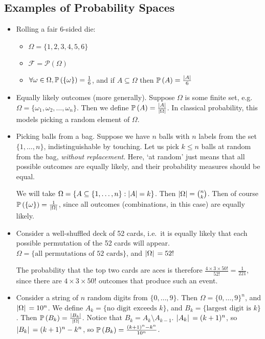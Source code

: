 \subsection{Examples of Probability Spaces}
\begin{itemize}
	\item Rolling a fair 6-sided die:
	      \begin{itemize}
		      \item \(\Omega = \{ 1, 2, 3, 4, 5, 6 \}\)
		      \item \(\mathcal F = \mathcal P(\Omega)\)
		      \item \(\forall \omega \in \Omega, \mathbb{P}\left({\{ \omega \}}\right) = \frac{1}{6}\), and if \(A \subseteq \Omega\) then \(\mathbb{P}\left({A}\right) = \frac{\abs{A}}{6}\)
	      \end{itemize}

	\item Equally likely outcomes (more generally).
	      Suppose \(\Omega\) is some finite set, e.g.
	      \(\Omega = \{ \omega_1, \omega_2, \dots, \omega_n \}\).
	      Then we define \(\mathbb{P}\left({A}\right) = \frac{\abs{A}}{\abs{\Omega}}\).
	      In classical probability, this models picking a random element of \(\Omega\).

	\item Picking balls from a bag.
	      Suppose we have \(n\) balls with \(n\) labels from the set \(\{1, \dots, n\}\), indistinguishable by touching.
	      Let us pick \(k \leq n\) balls at random from the bag, \textit{without replacement}.
	      Here, `at random' just means that all possible outcomes are equally likely, and their probability measures should be equal.

	      We will take \(\Omega = \{ A \subseteq \{1, \dots, n\} : \abs{A} = k \}\).
	      Then \(\abs{\Omega} = \binom{n}{k}\).
	      Then of course \(\mathbb{P}\left({\{ \omega \}}\right) = \frac{1}{\abs*{\Omega}}\), since all outcomes (combinations, in this case) are equally likely.

	\item Consider a well-shuffled deck of 52 cards, i.e.\ it is equally likely that each possible permutation of the 52 cards will appear.
	      \(\Omega = \{ \text{all permutations of 52 cards} \}\), and \(\abs*{\Omega} = 52!\)

	      The probability that the top two cards are aces is therefore \(\frac{4 \times 3 \times 50!}{52!} = \frac{1}{221}\), since there are \(4 \times 3 \times 50!\) outcomes that produce such an event.

	\item Consider a string of \(n\) random digits from \(\{0, \dots, 9\}\).
	      Then \(\Omega = \{ 0, \dots, 9 \}^n\), and \(\abs*{\Omega} = 10^n\).
	      We define \(A_k = \{ \text{no digit exceeds } k \}\), and \(B_k = \{ \text{largest digit is } k \}\).
	      Then \(\mathbb{P}\left({B_k}\right) = \frac{\abs*{B_k}}{\abs*{\Omega}}\).
	      Notice that \(B_k = A_k \setminus A_{k-1}\).
	      \(\abs*{A_k} = (k+1)^n\), so \(\abs*{B_k} = (k+1)^n - k^n\), so \(\mathbb{P}\left({B_k}\right) = \frac{(k+1)^n - k^n}{10^n}\).


\end{itemize}
